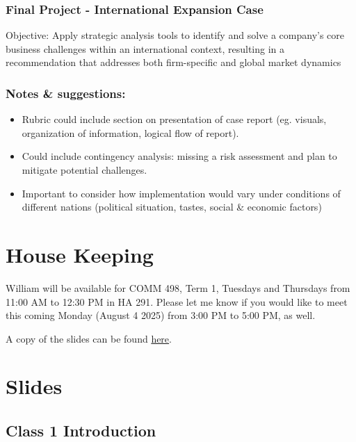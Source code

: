 \documentclass[
  11pt,
]{article}
\providecommand{\tightlist}{%
  \setlength{\itemsep}{0pt}\setlength{\parskip}{0pt}}
\begin{document}
\subsubsection{Final Project - International Expansion
Case}\label{final-project---international-expansion-case}

Objective: Apply strategic analysis tools to identify and solve a
company's core business challenges within an international context,
resulting in a recommendation that addresses both firm-specific and
global market dynamics

\subsubsection{Notes \& suggestions:}\label{notes-suggestions}

\begin{itemize}
\tightlist
\item
  Rubric could include section on presentation of case report (eg.
  visuals, organization of information, logical flow of report).
\item
  Could include contingency analysis: missing a risk assessment and plan
  to mitigate potential challenges.
\item
  Important to consider how implementation would vary under conditions
  of different nations (political situation, tastes, social \& economic
  factors)
\end{itemize}

\section{House Keeping}\label{house-keeping}

William will be available for COMM 498, Term 1, Tuesdays and Thursdays
from 11:00 AM to 12:30 PM in HA 291. Please let me know if you would
like to meet this coming Monday (August 4 2025) from 3:00 PM to 5:00 PM,
as well.

A copy of the slides can be found
\href{https://drive.google.com/drive/folders/1mERxpYGLjzyM1umdXgnxXbv5GSljAkrd?usp=sharing}{here}.

\section{Slides}\label{slides}

\subsection{Class 1 Introduction}\label{class-1-introduction}
\end{document}
